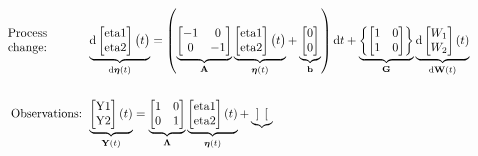 \documentclass[a4paper]{article}
\newcommand{\vect}[1]{\boldsymbol{\mathbf{#1}}}
\begin{document}
 \begin{normalsize}
 \setcounter{MaxMatrixCols}{200}
  \begin{align*}
          \parbox{10em}{\centering{Process\linebreak change:}}
    &\underbrace{\mathrm{d}
    	\begin{bmatrix}
    	\text{eta1}\\ 
    	\text{eta2}
    	\end{bmatrix} 
    	\big{(}t\big{)}}_{\mathrm{d} \vect{\eta} (t)}	=  \left(
    \underbrace{
    	\begin{bmatrix}
    	-1 & 0\\ 
    	0 & -1
    	\end{bmatrix}
    }_{{\vect{A}}} \underbrace{
    	\begin{bmatrix}
    	\text{eta1}\\ 
    	\text{eta2}
    	\end{bmatrix} 
    	\big{(}t\big{)}
    }_{\vect{\eta} (t)}	+ \underbrace{
    	\begin{bmatrix}
    	0\\ 
    	0
    	\end{bmatrix}
    }_{{\vect{b}}}\right) \mathrm{d}t + \underbrace{\left\{
    	\begin{bmatrix}
    	1 & 0\\ 
    	1 & 0
    	\end{bmatrix}\right\}
    }_{{\vect{G}}}
    \underbrace{\mathrm{d}
    	\begin{bmatrix}
    	W_{1}\\ 
    	W_{2}
    	\end{bmatrix} 
    	(t)}_{\mathrm{d} \vect{W}(t)} \\ \\
    \textrm{Observations: }
    &\underbrace{
    	\begin{bmatrix}
    	\text{Y1}\\ 
    	\text{Y2}
    	\end{bmatrix}  
    	(t)}_{\vect{Y}(t)} = 
    \underbrace{
    	\begin{bmatrix}
    	1 & 0\\ 
    	0 & 1
    	\end{bmatrix} 
    }_{{\vect{\Lambda}}} \underbrace{
    	\begin{bmatrix}
    	\text{eta1}\\ 
    	\text{eta2}
    	\end{bmatrix} 
    	(t)}_{\vect{\eta}(t)} +
    \underbrace{
    	\begin{bmatrix}

\end{bmatrix}}
\end{align*}
\end{normalsize}
\end{document}
